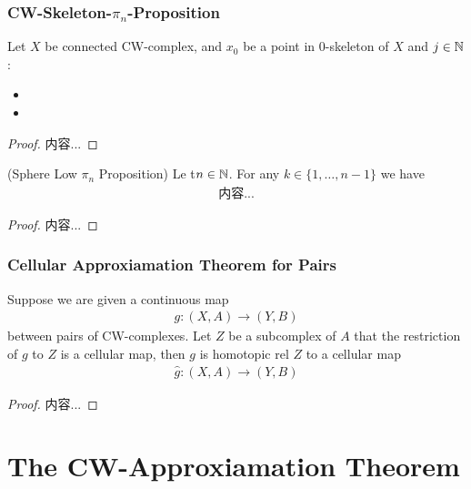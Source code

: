 \documentclass[Total.tex]{subfiles}
\begin{document}
		\subsubsection{CW-Skeleton-$\pi_n$-Proposition}
		\begin{proposition}
			Let $X$ be connected CW-complex, and $x_0$ be a point in $0$-skeleton of $X$ and $j\in \mathbb{N}$:
			\begin{itemize}
				\item 
				\item 
			\end{itemize}
		\end{proposition}
		\begin{proof}
			内容...
		\end{proof}
		
		\begin{proposition}
			(Sphere Low $\pi_n$ Proposition) Le t$n\in \mathbb{N}$. For any $k\in \{1,\dots,n-1\}$ we have
			\begin{gather*}
				内容...
			\end{gather*}
		\end{proposition}
		\begin{proof}
			内容...
		\end{proof}
		\subsubsection{Cellular Approxiamation Theorem for Pairs}
		\begin{theorem}
			Suppose we are given a continuous map
			\begin{gather*}
				g:(X,A)\rightarrow (Y,B)
			\end{gather*}
			between pairs of CW-complexes. Let $Z$ be a subcomplex of $A$ that the restriction of $g$ to $Z$ is a cellular map, then $g$ is homotopic rel $Z$ to a cellular map
			\begin{gather*}
				\hat{g}:(X,A)\rightarrow (Y,B)
			\end{gather*}
		\end{theorem}
		\begin{proof}
			内容...
		\end{proof}
		\section{The CW-Approxiamation Theorem}
\end{document}
